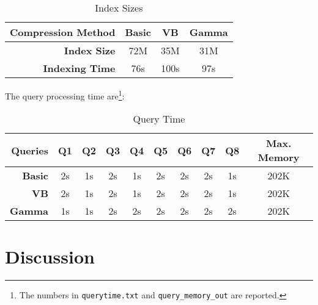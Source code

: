 \documentclass{article}
\begin{document}
\begin{table}[h]
  \centering
  \begin{tabular}{|r|c|c|c|}
    \hline
    \textbf{Compression Method} & Basic & VB & Gamma\\
    \hline
    \textbf{Index Size} & 72M & 35M & 31M\\
    \hline
    \textbf{Indexing Time} & 76s & 100s & 97s\\
    \hline
  \end{tabular}
  \caption{Index Sizes}
\end{table}

The query processing time are{\footnote{The numbers in {\texttt{querytime.txt}}
and {\texttt{query\_memory\_out}} are reported.}}:

\begin{table}[h]
  \centering
  \begin{tabular}{|r|c|c|c|c|c|c|c|c|c|}
    \hline
    \textbf{Queries} & Q1 & Q2 & Q3 & Q4 & Q5 & Q6 & Q7 & Q8 & Max. Memory\\
    \hline
    \textbf{Basic} & 2s & 1s & 2s & 1s & 2s & 2s & 2s & 1s & 202K\\
    \hline
    \textbf{VB} & 2s & 1s & 2s & 1s & 2s & 2s & 2s & 1s & 202K\\
    \hline
    \textbf{Gamma} & 1s & 1s & 2s & 2s & 2s & 2s & 2s & 2s & 202K\\
    \hline
  \end{tabular}
  \caption{Query Time}
\end{table}

\section{Discussion}
\end{document}
